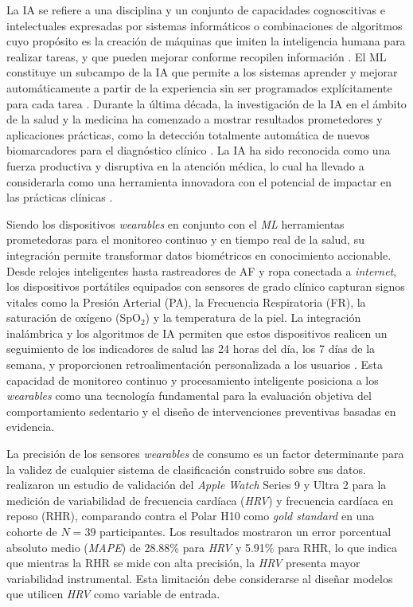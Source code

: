 La IA se refiere a una disciplina y un conjunto de capacidades cognoscitivas e intelectuales expresadas por sistemas informáticos o combinaciones de algoritmos cuyo propósito es la creación de máquinas que imiten la inteligencia humana para realizar tareas, y que pueden mejorar conforme recopilen información \cite{Escalante2023}. El ML constituye un subcampo de la IA que permite a los sistemas aprender y mejorar automáticamente a partir de la experiencia sin ser programados explícitamente para cada tarea \cite{Vellido2020Importance}. Durante la última década, la investigación de la IA en el ámbito de la salud y la medicina ha comenzado a mostrar resultados prometedores y aplicaciones prácticas, como la detección totalmente automática de nuevos biomarcadores para el diagnóstico clínico \cite{Farrahi2024MachineLearning}. La IA ha sido reconocida como una fuerza productiva y disruptiva en la atención médica, lo cual ha llevado a considerarla como una herramienta innovadora con el potencial de impactar en las prácticas clínicas \cite{Santos2021Perceptions,SyedAbdul2020DataAnalytics}.

Siendo los dispositivos \textit{wearables} en conjunto con el \textit{ML} herramientas prometedoras para el monitoreo continuo y en tiempo real de la salud, su integración permite transformar datos biométricos en conocimiento accionable. Desde relojes inteligentes hasta rastreadores de AF y ropa conectada a \textit{internet}, los dispositivos portátiles equipados con sensores de grado clínico capturan signos vitales como la Presión Arterial (PA), la Frecuencia Respiratoria (FR), la saturación de oxígeno (SpO$_2$) y la temperatura de la piel. La integración inalámbrica y los algoritmos de IA permiten que estos dispositivos realicen un seguimiento de los indicadores de salud las 24 horas del día, los 7 días de la semana, y proporcionen retroalimentación personalizada a los usuarios \cite{Khan2024Wearable}. Esta capacidad de monitoreo continuo y procesamiento inteligente posiciona a los \textit{wearables} como una tecnología fundamental para la evaluación objetiva del comportamiento sedentario y el diseño de intervenciones preventivas basadas en evidencia.

La precisión de los sensores \textit{wearables} de consumo es un factor determinante para la validez de cualquier sistema de clasificación construido sobre sus datos. \cite{OGrady2024AppleWatch} realizaron un estudio de validación del \textit{Apple Watch} Series 9 y Ultra 2 para la medición de variabilidad de frecuencia cardíaca (\textit{HRV}) y frecuencia cardíaca en reposo (RHR), comparando contra el Polar H10 como \textit{gold standard} en una cohorte de $N=39$ participantes. Los resultados mostraron un error porcentual absoluto medio (\textit{MAPE}) de 28.88\% para \textit{HRV} y 5.91\% para RHR, lo que indica que mientras la RHR se mide con alta precisión, la \textit{HRV} presenta mayor variabilidad instrumental. Esta limitación debe considerarse al diseñar modelos que utilicen \textit{HRV} como variable de entrada.

